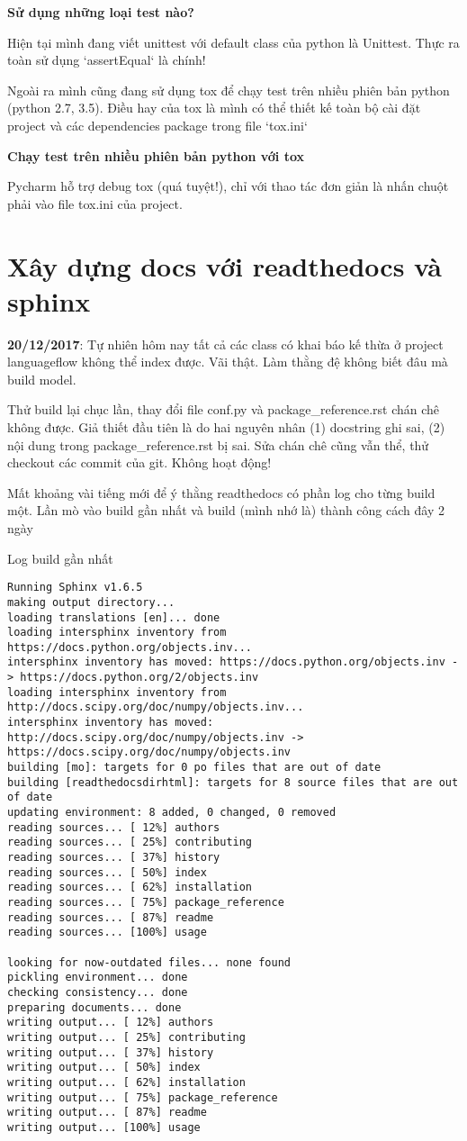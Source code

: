 \textbf{Sử dụng những loại test nào?}

Hiện tại mình đang viết unittest với default class của python là Unittest. Thực ra toàn sử dụng `assertEqual` là chính!

Ngoài ra mình cũng đang sử dụng tox để chạy test trên nhiều phiên bản python (python 2.7, 3.5). Điều hay của tox là mình có thể thiết kế toàn bộ cài đặt project và các dependencies package trong file `tox.ini`

\textbf{Chạy test trên nhiều phiên bản python với tox}

Pycharm hỗ trợ debug tox (quá tuyệt!), chỉ với thao tác đơn giản là nhấn chuột phải vào file tox.ini của project.

\section{Xây dựng docs với readthedocs và sphinx}

\noindent \textbf{20/12/2017}: Tự nhiên hôm nay tất cả các class có khai báo kế thừa ở project languageflow không thể index được. Vãi thật. Làm thằng đệ không biết đâu mà build model.

Thử build lại chục lần, thay đổi file conf.py và package\_reference.rst chán chê không được. Giả thiết đầu tiên là do hai nguyên nhân (1) docstring ghi sai, (2) nội dung trong package\_reference.rst bị sai. Sửa chán chê cũng vẫn thể, thử checkout các commit của git. Không hoạt động!

Mất khoảng vài tiếng mới để ý thằng readthedocs có phần log cho từng build một. Lần mò vào build gần nhất và build (mình nhớ là) thành công cách đây 2 ngày

\noindent Log build gần nhất

\begin{lstlisting}
Running Sphinx v1.6.5
making output directory...
loading translations [en]... done
loading intersphinx inventory from https://docs.python.org/objects.inv...
intersphinx inventory has moved: https://docs.python.org/objects.inv -> https://docs.python.org/2/objects.inv
loading intersphinx inventory from http://docs.scipy.org/doc/numpy/objects.inv...
intersphinx inventory has moved: http://docs.scipy.org/doc/numpy/objects.inv -> https://docs.scipy.org/doc/numpy/objects.inv
building [mo]: targets for 0 po files that are out of date
building [readthedocsdirhtml]: targets for 8 source files that are out of date
updating environment: 8 added, 0 changed, 0 removed
reading sources... [ 12%] authors
reading sources... [ 25%] contributing
reading sources... [ 37%] history
reading sources... [ 50%] index
reading sources... [ 62%] installation
reading sources... [ 75%] package_reference
reading sources... [ 87%] readme
reading sources... [100%] usage

looking for now-outdated files... none found
pickling environment... done
checking consistency... done
preparing documents... done
writing output... [ 12%] authors
writing output... [ 25%] contributing
writing output... [ 37%] history
writing output... [ 50%] index
writing output... [ 62%] installation
writing output... [ 75%] package_reference
writing output... [ 87%] readme
writing output... [100%] usage
\end{lstlisting}

